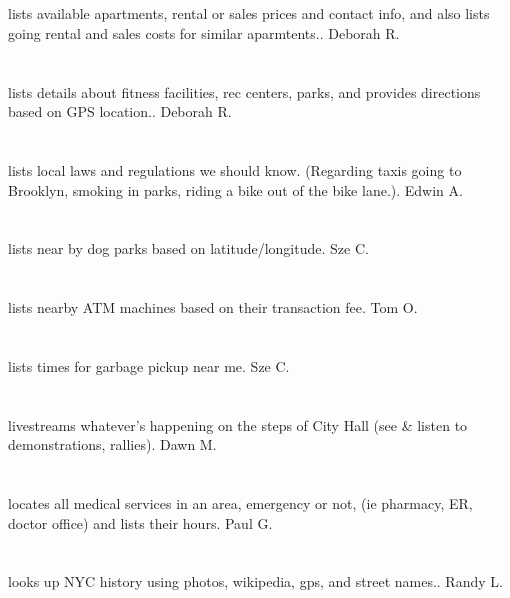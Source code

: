 \section{}lists available apartments,  rental or sales prices and contact info,  and also lists going rental and sales costs for similar aparmtents.. Deborah R.
\section{}lists details about fitness facilities,  rec centers,  parks,  and provides directions based on GPS location.. Deborah R.
\section{}lists local laws and regulations we should know. (Regarding taxis going to Brooklyn,  smoking in parks,  riding a bike out of the bike lane.). Edwin A.
\section{}lists near by dog parks based on latitude/longitude. Sze C.
\section{}lists nearby ATM machines based on their transaction fee. Tom O.
\section{}lists times for garbage pickup near me. Sze C.
\section{} livestreams whatever's happening on the steps of City Hall (see \& listen to demonstrations,  rallies). Dawn M.
\section{}locates all medical services in an area,  emergency or not,  (ie pharmacy,  ER,  doctor office) and lists their hours. Paul G.
\section{}looks up NYC history using photos,  wikipedia,  gps,  and street names.. Randy L.
